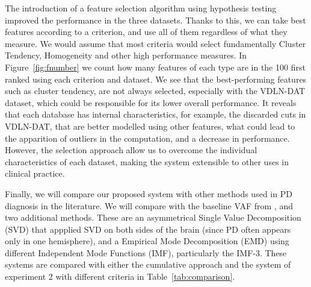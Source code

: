 The introduction of a feature selection algorithm using hypothesis testing improved the performance in the three datasets. Thanks to this, we can take best features according to a criterion, and use all of them regardless of what they measure. We would assume that most criteria would select fundamentally Cluster Tendency, Homogeneity and other high performance measures. In Figure~\ref{fig:fnumber} we count how many features of each type are in the 100 first ranked using each criterion and dataset. We see that the best-performing features such as cluster tendency, are not always selected, especially with the VDLN-DAT dataset, which could be responsible for its lower overall performance. It reveals that each database has internal characteristics, for example, the discarded cuts in VDLN-DAT, that are better modelled using other features, what could lead to the apparition of outliers in the computation, and a decrease in performance. However, the selection approach allow us to overcome the individual characteristics of each dataset, making the system extensible to other uses in clinical practice. 

Finally, we will compare our proposed system with other methods used in \ac{PD} diagnosis in the literature. We will compare with the baseline \ac{VAF} from \cite{Illan2012}, and two additional methods. These are an asymmetrical Single Value Decomposition (SVD) \cite{Segovia2012} that appplied SVD on both sides of the brain (since PD often appears only in one hemisphere), and a Empirical Mode Decomposition (EMD)  \cite{Rojas2012} using different Independent Mode Functions (IMF), particularly the IMF-3. These systems are compared with either the cumulative approach and the system of experiment 2 with different criteria in Table~\ref{tab:comparison}.

